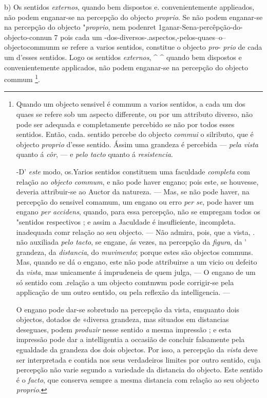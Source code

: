 b) Os sentidos \emph{externos}, quando bem dispostos e. convenientemente applieados, não podem enganar-se na percepção do objecto \emph{proprio}. Se não podem enganar-se na percepção do objecto "\emph{proprio}, nem podenret 1ganar-Sena-percêpção-do-objecto-connun 7 pois cada um -dos-diversos-.aspectos,-pelos-quaes--o--objectocommunm se refere a varios sentidos, constitue o objecto \emph{pro}- \emph{prio} de cada um d'esses sentidos. Logo os sentidos \emph{externos}, \textasciicircum{} \textasciicircum{} quando bem dispostos e convenientemente applicados, não podem enganar-se na percepção do objecto commum \footnote{Quando um objecto sensivel é commum a varios sentidos, a cada um dos quaes se refere sob um aspecto differente, ou por um attributo diverso, não pode ser adequada e completamente percebido se não por todos esses sentidos. Então, cada. sentido percebe do objecto \emph{commui} o silributo, que é objecto \emph{proprio} d'esse sentido. Ássim uma grandeza é percebida --- \emph{pela vista} quanto á \emph{côr}, --- e \emph{pelo tacto} quanto á \emph{resistencia}.\par -D' \emph{este} modo, os.Yarios sentidos constituem uma faculdade \emph{completa} com relação ao \emph{objecto commum}, e não pode haver engano; pois este, se houvesse, deveria attribuir-se ao Auctor da natureza. --- Mas, se não pode haver, na percepção do sensivel comamum, um engano ou erro \emph{per se}, pode haver um engano \emph{per accidens}, quando, para essa percepção, não se empregam todos os "sentidos respectivos ; e assim a Jaculdade é insuflieiente, incompleta. inadequada comr relação ao seu objecto. --- Não admira, pois, que a vista, . não auxiliada \emph{pelo tacto}, se engane, ás vezes, na percepção da \emph{figura}, da ' grandeza, da \emph{distancia}, do \emph{muvimento}; porque estes são objectos communs. Mas, quando se dá o engano, este não pode attribuirse a um vicio ou defeito da \emph{vista}, mas unicamente á imprudeneia de quem julga, --- O engano de um só sentido com .relação a um objecto comtmwm pode corrigir-se pela applicação de um outro sentido, ou pela reflexão da intelligencia. ---\par O engano pode dar-se sobretudo na percepção da vista, emquanto dois objectos, dotados de «diversa grandeza, mas situados em distancias deseguaes, podem \emph{produzir} nesse sentido \emph{a} mesma impressão ; e esta impressão pode dar a intelligentia a occasião de concluir falsamente pela egualdade da grandeza dos dois objectos. Por isso, a percepção da \emph{vista} deve ser interpretada e contida nos seus verdadeiros limites por outro sentido, cuja percepção não varie segundo a variedade da distancia do objecto. Este sentido é o \emph{facto}, que conserva sempre a mesma distancia com relação ao seu objecto \emph{proprio}.}.

